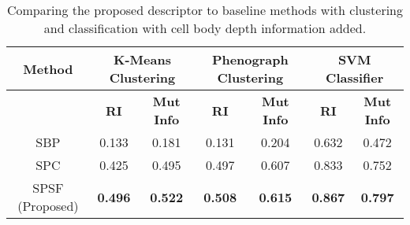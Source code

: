 \documentclass[runningheads]{llncs}
\begin{document}
\begin{table}
    \centering
    \begin{tabular}{|c|c|c|c|c|c|c|}
        \hline
        \textbf{Method} & \multicolumn{2}{|c|}{K-Means Clustering} & \multicolumn{2}{|c|}{Phenograph Clustering} & \multicolumn{2}{|c|}{SVM Classifier}  \\
        \hline
         & \textbf{RI} & \textbf{Mut Info} & \textbf{RI} & \textbf{Mut Info} & \textbf{RI} & \textbf{Mut Info}\\
        \hline
        SBP & 0.133 & 0.181 & 0.131 & 0.204 & 0.632 & 0.472\\
        SPC & 0.425 & 0.495 &  0.497 & 0.607 & 0.833 & 0.752\\
        SPSF (Proposed) & \textbf{0.496} & \textbf{0.522} & \textbf{0.508} & \textbf{0.615} & \textbf{0.867} & \textbf{0.797}\\
        \hline
    \end{tabular}
    \caption{Comparing the proposed descriptor to baseline methods with clustering and classification with cell body depth information added. }
    \label{tab:withnormandy}
\end{table}
\end{document}
